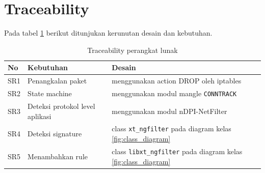 \section{Traceability}

Pada tabel \ref{table:software_traceability_design} berikut ditunjukan kerunutan desain dan kebutuhan.

\begin{table}[H]
	\caption{Traceability perangkat lunak}
	\label{table:software_traceability_design}
	\begin{tabularx}{\textwidth}{|l|X|X|}
		\hline
		\textbf{No} & \textbf{Kebutuhan} & \textbf{Desain} \\ \hline
		SR1 & Penangkalan paket & menggunakan action DROP oleh iptables \\ \hline 
		SR2 & State machine &  menggunakan modul mangle \verb|CONNTRACK| \\ \hline
		SR3 & Deteksi protokol level aplikasi & menggunakan modul nDPI-NetFilter \\ \hline
		SR4 & Deteksi signature & class \verb|xt_ngfilter| pada diagram kelas \ref{fig:class_diagram} \\ \hline
		SR5 & Menambahkan rule & class \verb|libxt_ngfilter| pada diagram kelas \ref{fig:class_diagram} \\ \hline
 	\end{tabularx}
\end{table}
